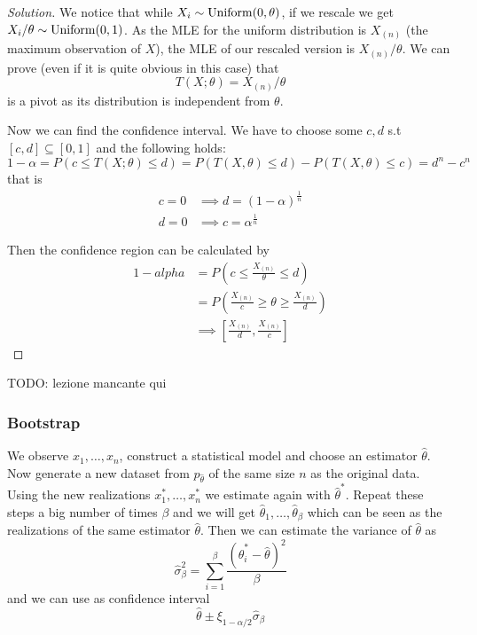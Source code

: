 \documentclass[12pt]{extarticle}
\newcommand{\Uniform}{{\operatorfont Uniform}}
\begin{document}
\begin{proof}[Solution]
    We notice that while $X_i \sim \Uniform(0, \theta)$, if we rescale we get $X_i/ \theta \sim \Uniform(0,1)$.
    As the MLE for the uniform distribution is $X_{(n)}$ (the maximum observation of $X$), the MLE of our rescaled version is $X_{(n)} / \theta$.
    We can prove (even if it is quite obvious in this case) that
    \begin{equation}
        T(X; \theta) = X_{(n)} / \theta
    \end{equation}
    is a pivot as its distribution is independent from $\theta$.

    Now we can find the confidence interval.
    We have to choose some $c, d$ s.t $[c, d] \subseteq [0, 1]$ and the following holds:
    \begin{equation}
        1 - \alpha =  P(c \leq T(X; \theta) \leq d) = P (T(X, \theta) \leq d) - P (T(X, \theta) \leq c) = d^n - c^n
    \end{equation}
    that is
    \begin{align}
        c = 0 & \implies d = (1- \alpha)^{\frac{1}{n}} \\
        d = 0 & \implies c = \alpha^{\frac{1}{n}}
    \end{align}

    Then the confidence region can be calculated by
    \begin{align}
        1 - alpha & = P\left(c \leq \frac{X_{(n)}}{\theta} \leq d\right)                  \\
                  & = P\left(\frac{X_{(n)}}{c} \geq \theta \geq \frac{X_{(n)}}{d} \right) \\
                  & \implies \left[ \frac{X_{(n)}}{d}, \frac{X_{(n)}}{c} \right]
    \end{align}
\end{proof}

TODO: lezione mancante qui

\subsubsection{Bootstrap}

We observe $x_1, \dots, x_n$, construct a statistical model and choose an estimator $\hat \theta$.
Now generate a new dataset from $p_{\hat\theta}$ of the same size $n$ as the original data.
Using the new realizations $x_1^*, \dots, x_n^*$ we estimate again with $\hat \theta^*$.
Repeat these steps a big number of times $\beta$ and we will get $\hat \theta_1, \dots, \hat \theta_\beta$ which can be seen as the realizations of the same estimator $\hat \theta$.
Then we can estimate the variance of $\hat \theta$ as
\begin{equation}
    \hat \sigma_{\beta}^2 = \sum_{i = 1}^\beta \frac{(\hat \theta_i^* - \hat \theta)^2}{\beta}
\end{equation}
and we can use as confidence interval
\begin{equation}
    \hat \theta \pm \xi_{1 - \alpha/2} \hat \sigma_\beta
\end{equation}
\end{document}
